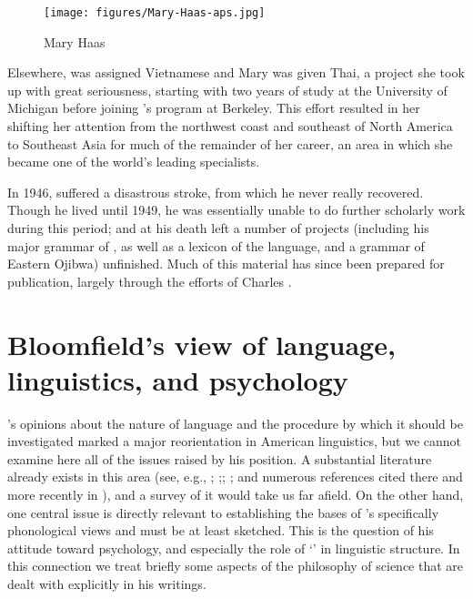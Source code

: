 \begin{wrapfigure}{r}{.4\textwidth}
  \texttt{[image: figures/Mary-Haas-aps.jpg]}
  \caption{Mary Haas}
  \label{fig:ch.bloomfield.haas_aps}
\end{wrapfigure}
Elsewhere,  was assigned Vietnamese and Mary {\Haas} was
given Thai, a project she took up with great seriousness, starting
with two years of study at the University of Michigan before joining
{\Kroeber}'s program at Berkeley. This effort resulted in her shifting
her attention from the northwest coast and southeast of North America
to Southeast Asia for much of the remainder of her career, an area in
which she became one of the world's leading specialists.

In 1946, {\Bloomfield} suffered a disastrous stroke, from which he never
really recovered. Though he lived until 1949, he was essentially
unable to do further scholarly work during this period; and at his
death left a number of projects (including his major grammar of
, as well as a lexicon of the language, and a grammar of
Eastern Ojibwa) unfinished. Much of this material has since been
prepared for publication, largely through the efforts of Charles
{\Hockett}.

\section{Bloomfield's view of language, linguistics, and psychology}

{\Bloomfield}'s opinions about the nature of language and the procedure
by which it should be investigated marked a major reorientation in
American linguistics, but we cannot examine here all of the issues
raised by his position. A substantial literature already exists in
this area (see, e.g., \citet{hockett70:bloomfield.anthology};
\citet{esper68:bloomfield};\citet{teeter69:bloomfield};
\citet{stark72:bloomfield}; \citet{hymes.fought81:structuralism} and
numerous references cited there and more recently in
\citet{fought99:bloomfield}), and a survey of it would take us far
afield. On the other hand, one central issue is directly relevant to
establishing the bases of {\Bloomfield}'s specifically phonological views
and must be at least sketched. This is the question of his attitude
toward psychology, and especially the role of `' in linguistic
structure. In this connection we treat briefly some aspects of the
philosophy of science that are dealt with explicitly in his writings.

